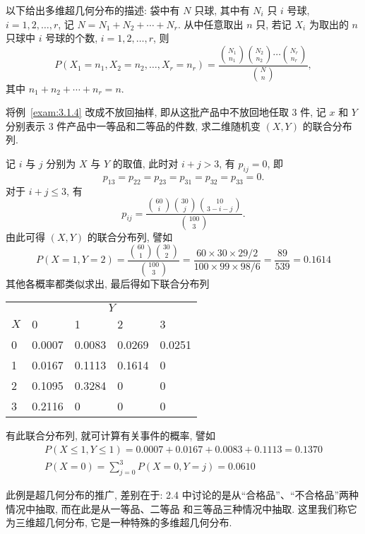   以下给出多维超几何分布的描述: 袋中有 $N$ 只球, 其中有 $N_i$ 只 $i$ 号球, $i=1,2,\ldots,r$,
 记 $N=N_1+N_2+\cdots+N_r$. 从中任意取出 $n$ 只, 若记 $X_i$ 为取出的 $n$ 只球中 $i$ 号球的个数, $i=1,2,\ldots,r$, 则
 \begin{equation}\label{eq:3.1.6}
  	P(X_1=n_1,X_2=n_2,\ldots,X_r=n_r)=\frac	{\binom{N_1}{n_1}\binom{N_2}{n_2}\cdots\binom{N_r}{n_r}}{\binom{N}{n}},
 \end{equation}
 其中 $n_1+n_2+\cdots+n_r=n$.
 \begin{example}\label{exam:3.1.5}
 将例~\ref{exam:3.1.4} 改成不放回抽样, 即从这批产品中不放回地任取 3 件, 记 $x$ 和 $Y$ 分别表示 3 件产品中一等品和二等品的件数, 
 求二维随机变 $(X,Y)$ 的联合分布列. 
 \end{example}
 \begin{solution}
记 $i$ 与 $j$ 分别为 $X$ 与 $Y$ 的取值, 此时对 $i+j>3$, 有 $p_{ij}=0$, 即
\[
	p_{13}=p_{22}=p_{23}=p_{31}=p_{32}=p_{33}=0.
\]
对于 $i+j\leq 3$, 有
\[
	p_{ij}=\frac{\binom{60}{i}\binom{30}{j}\binom{10}{3-i-j}}{\binom{100}{3}}.
\]
由此可得 $(X,Y)$ 的联合分布列, 譬如
\[
P(X=1, Y=2)=\frac{\binom{60}{1}\binom{30}{2}}{\binom{100}{3}}
=\frac{60 \times 30 \times 29 / 2}{100 \times 99 \times 98 / 6}=\frac{89}{539}=0.1614
\]
其他各概率都类似求出, 最后得如下联合分布列
\begin{center}
\begin{tabularx}{0.8\textwidth}{ZZZZZ}
\toprule
&	\\
$X$	&	0&	1&	2&	3		\\
	&	0.0007&	0.0083&	0.0269&	0.0251	\\
	&	0.0167&	0.1113&	0.1614&	0		\\
	&	0.1095&	0.3284&	0&		0		\\
	&	0.2116&	0&		0&		0		\\			
\bottomrule
\end{tabularx}
\end{center}
有此联合分布列, 就可计算有关事件的概率, 譬如
\[
\begin{gathered}
P(X \leq 1, Y \leq 1)=0.0007+0.0167+0.0083+0.1113=0.1370 \\
P(X=0)=\sum_{j=0}^{3} P(X=0, Y=j)=0.0610
\end{gathered}
\]
\end{solution}
 此例是超几何分布的推广, 差别在于: 2.4 中讨论的是从“合格品”、“不合格品”两种情况中抽取, 而在此是从一等品、二等品
 和三等品三种情况中抽取. 这里我们称它为三维超几何分布, 它是一种特殊的多维超几何分布. 

